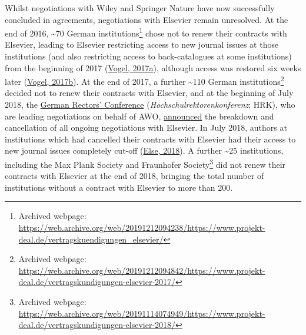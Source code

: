 \documentclass[
]{article}
\begin{document}
Whilst negotiations with Wiley and Springer Nature have now successfully concluded in agreements, negotiations with Elsevier remain unresolved. At the end of 2016, \textasciitilde70 German institutions\footnote{Archived webpage: \url{https://web.archive.org/web/20191212094238/https://www.projekt-deal.de/vertragskuendigungen_elsevier/}} chose not to renew their contracts with Elsevier, leading to Elsevier restricting access to new journal issues at those institutions (and also restricting access to back-catalogues at some institutions) from the beginning of 2017 (\href{https://doi.org/10.1126/science.355.6320.17}{Vogel, 2017a}), although access was restored six weeks later (\href{https://doi.org/10.1126/science.aal0753}{Vogel, 2017b}). At the end of 2017, a further \textasciitilde110 German institutions\footnote{Archived webpage: \url{https://web.archive.org/web/20191212094842/https://www.projekt-deal.de/vertragskundigungen-elsevier-2017/}} decided not to renew their contracts with Elsevier, and at the beginning of July 2018, the \href{https://www.hrk.de/}{German Rectors' Conference} (\emph{Hochschulrektorenkonferenz}; HRK), who are leading negotiations on behalf of AWO, \href{https://www.hrk.de/presse/pressemitteilungen/pressemitteilung/meldung/verhandlungen-von-deal-und-elsevier-elsevier-forderungen-sind-fuer-die-wissenschaft-inakzeptabel-440/}{announced} the breakdown and cancellation of all ongoing negotiations with Elsevier. In July 2018, authors at institutions which had cancelled their contracts with Elsevier had their access to new journal issues completely cut-off (\href{https://doi.org/10.1038/d41586-018-05754-1}{Else, 2018}). A further \textasciitilde25 institutions, including the Max Plank Society and Fraunhofer Society\footnote{Archived webpage: \url{https://web.archive.org/web/20191114074949/https://www.projekt-deal.de/vertragskundigungen-elsevier-2018/}} did not renew their contracts with Elsevier at the end of 2018, bringing the total number of institutions without a contract with Elsevier to more than 200.
\end{document}
